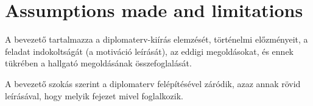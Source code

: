 \chapter{Assumptions made and limitations}

A bevezető tartalmazza a diplomaterv-kiírás elemzését, történelmi előzményeit, 
a feladat indokoltságát (a motiváció leírását), az eddigi megoldásokat, 
és ennek tükrében a hallgató megoldásának összefoglalását.

A bevezető szokás szerint a diplomaterv felépítésével záródik, 
azaz annak rövid leírásával, hogy melyik fejezet mivel foglalkozik.
